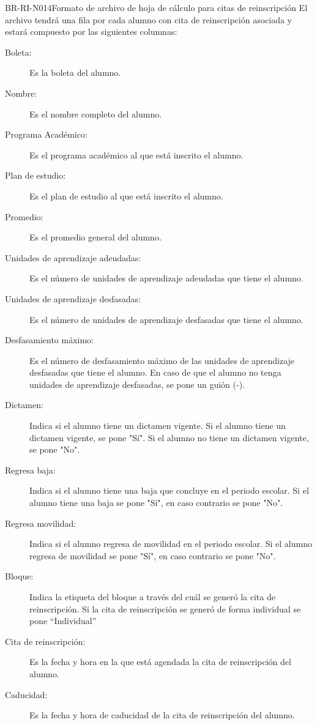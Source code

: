 \begin{BusinessRule}{BR-RI-N014}{Formato de archivo de hoja de cálculo para citas de reinscripción}
	El archivo tendrá una fila por cada alumno con cita de reinscripción asociada y estará compuesto por las siguientes columnas:
	\begin{description}
		\item [Boleta:] Es la boleta del alumno.
		\item [Nombre:] Es el nombre completo del alumno.
		\item [Programa Académico:] Es el programa académico al que está inscrito el alumno.
		\item [Plan de estudio:] Es el plan de estudio al que está inscrito el alumno.
		\item [Promedio:] Es el promedio general del alumno.
		\item [Unidades de aprendizaje adeudadas:] Es el número de unidades de aprendizaje adeudadas que tiene el alumno.
		\item [Unidades de aprendizaje desfasadas:] Es el número de unidades de aprendizaje desfasadas que tiene el alumno.
		\item [Desfasamiento máximo:] Es el número de desfasamiento máximo de las unidades de aprendizaje desfasadas que tiene el alumno. En caso de que el alumno no tenga unidades de aprendizaje desfasadas, se pone un guión (-).
		\item [Dictamen:] Indica si el alumno tiene un dictamen vigente. Si el alumno tiene un dictamen vigente, se pone "Sí". Si el alumno no tiene un dictamen vigente, se pone "No".
		\item [Regresa baja:] Indica si el alumno tiene una baja que concluye en el periodo escolar. Si el alumno tiene una baja se pone "Sí", en caso contrario se pone "No".
		\item [Regresa movilidad:] Indica si el alumno regresa de movilidad en el periodo escolar. Si el alumno regresa de movilidad se pone "Sí", en caso contrario se pone "No".
		\item [Bloque:] Indica la etiqueta del bloque a través del cuál se generó la cita de reinscripción. Si la cita de reinscripción se generó de forma individual se pone ``Individual''
		\item [Cita de reinscripción:] Es la fecha y hora en la que está agendada la cita de reinscripción del alumno.
		\item [Caducidad:] Es la fecha y hora de caducidad de la cita de reinscripción del alumno. 
	\end{description}


\end{BusinessRule}
